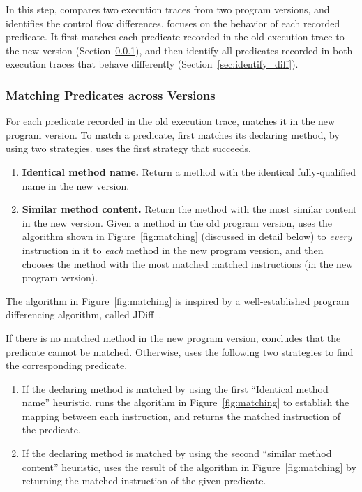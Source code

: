 

In this step, \ourtool compares two execution traces
from two program versions, and identifies the
control flow differences. \ourtool focuses on the
behavior of each recorded predicate. It first 
matches each predicate recorded in the old
execution trace to the new version (Section~\ref{sec:match_predicate}),
and then identify all predicates recorded in both execution traces that
behave differently (Section~\ref{sec:identify_diff}).


\subsubsection{Matching Predicates across Versions}
\label{sec:match_predicate}

For each predicate recorded in the old execution trace,
\ourtool matches it in the new program version.
To match a predicate, \ourtool first matches its declaring method,
by using two strategies. \ourtool uses
the first strategy that succeeds.



\begin{enumerate}
\item \textbf{Identical method name.} Return a method with the identical
fully-qualified name in the new version.
\item \textbf{Similar method content.} Return the method with
the most similar content in the new version. Given
a method in the old program version, \ourtool
uses the algorithm shown in Figure~\ref{fig:matching} (discussed
in detail below) to \textit{every} instruction in it to
\textit{each} method in the new program version, and then
chooses the method with the most matched matched instructions
(in the new program version).
\end{enumerate}

The algorithm in Figure~\ref{fig:matching} is inspired by
a well-established program differencing algorithm, called
JDiff~\cite{}. 

If there is no matched method in the new program
version, \ourtool concludes that the predicate cannot be
matched. Otherwise, \ourtool uses the following two strategies
to find the corresponding predicate.

\begin{enumerate}
\item If the declaring method is matched by using the first
``Identical method name'' heuristic, \ourtool runs the algorithm
in Figure~\ref{fig:matching} to establish the mapping between
each instruction, and returns the matched instruction of the
predicate.
\item If the declaring method is matched by using the second
``similar method content'' heuristic,  \ourtool
uses the result of the algorithm in Figure~\ref{fig:matching}
by returning the matched instruction of the given predicate.
\end{enumerate}

